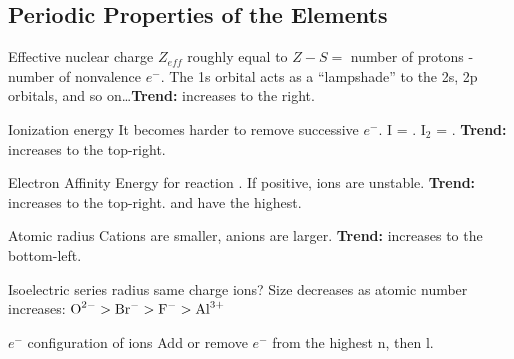 \begin{mdframed}
\subsection{Periodic Properties of the Elements}
\begin{multicols}{2}
\begin{compactdesc}
\item[Effective nuclear charge] $Z_{eff}$ roughly equal to $Z - S =$ number of
    protons - number of nonvalence $e^-$. The 1s orbital acts as a
    ``lampshade'' to the 2s, 2p orbitals, and so on\dots \textbf{Trend:} increases to
    the right.
\item[Ionization energy] It becomes harder to remove successive $e^-$.
    I = .
    I$_2$ = .
    \textbf{Trend:} increases to the top-right.
\item[Electron Affinity] Energy for reaction .
    If positive, ions are unstable. \textbf{Trend:} increases to the top-right.
     and  have the highest.
\item[Atomic radius] Cations are smaller, anions are larger. \textbf{Trend:} increases
    to the bottom-left.
\item[Isoelectric series radius] same charge ions? Size decreases as atomic
    number increases: $\ce{O^{2-}} > \ce{Br^-} > \ce{F^-} > \ce{Al^{3+}}$
\item[$e^-$ configuration of ions] Add or remove $e^-$ from the highest n,
    then l.
\end{compactdesc}
\end{multicols}
\end{mdframed}




